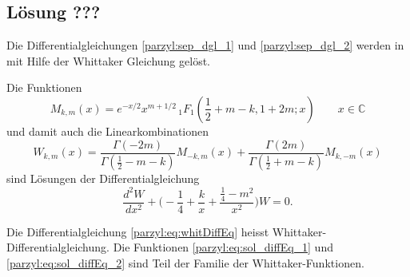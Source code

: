 \subsection{Lösung ???}
Die Differentialgleichungen \eqref{parzyl:sep_dgl_1} und \eqref{parzyl:sep_dgl_2} werden in \cite{parzyl:whittaker}
mit Hilfe der Whittaker Gleichung gelöst.
\begin{satz}
	Die Funktionen 
	\begin{equation}
		 M_{k,m}(x) = 
		    e^{-x/2} x^{m+1/2} \,
		    {}_{1} F_{1}
		    (
		        {\textstyle \frac{1}{2}} 
		        + m - k, 1 + 2m; x) \qquad x \in \mathbb{C}
		 \label{parzyl:eq:sol_diffEq_1}
	\end{equation}
	und damit auch die Linearkombinationen 
	 \begin{equation}
		        W_{k,m}(x) = \frac{
		            \Gamma \left( -2m\right)
		        }{
		            \Gamma \left( {\textstyle \frac{1}{2}} - m - k\right)
		        }
		        M_{-k, m} \left(x\right)
		        +
		        \frac{
		            \Gamma \left( 2m\right)
		        }{
		            \Gamma \left( {\textstyle \frac{1}{2}} + m - k\right)
		        }
		       M_{k, -m} \left(x\right)
		      \label{parzyl:eq:sol_diffEq_2}
	\end{equation}
	sind Lösungen der Differentialgleichung 
	\begin{equation}
		        \frac{d^2W}{d x^2} +
		        \biggl( -\frac{1}{4}  + \frac{k}{x} + \frac{\frac{1}{4} - m^2}{x^2} \biggr) W = 0.
		        \label{parzyl:eq:whitDiffEq}
	\end{equation}
	
\end{satz}
\begin{definition}
	Die Differentialgleichung \ref{parzyl:eq:whitDiffEq}  heisst Whittaker-Differentialgleichung. Die Funktionen \ref{parzyl:eq:sol_diffEq_1} und \ref{parzyl:eq:sol_diffEq_2} sind Teil der Familie der Whittaker-Funktionen.
\end{definition}
